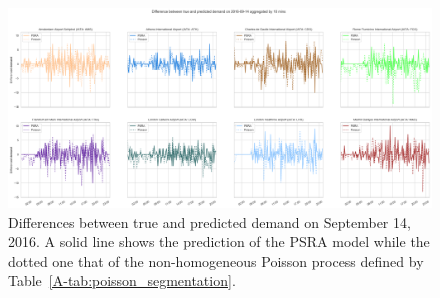 \documentclass[draft,review]{elsarticle}
\begin{document}
\begin{figure}
    \includegraphics[width=\textwidth]{prediction_last_day}
    \caption{Differences between true and predicted demand on September 14, 2016. A solid line shows the prediction of the \acs{PSRA} model while the dotted one that of the non-homogeneous Poisson process defined by Table~\ref{A-tab:poisson_segmentation}.}\label{fig:pred_last_day}
\end{figure}
\end{document}
